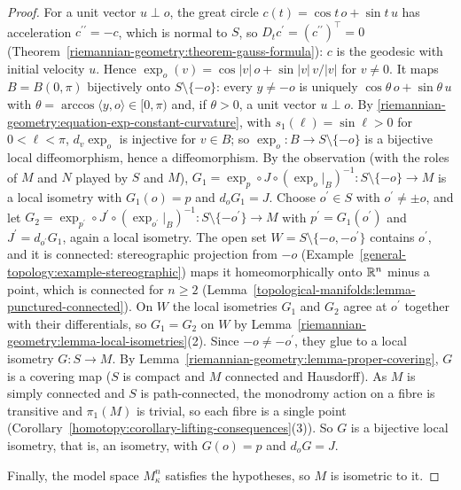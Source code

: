 \begin{proof}
For a unit vector $u \perp o$, the great circle $c(t) = \cos t\,o + \sin t\,u$ has acceleration $c^{\prime\prime} = -c$, which is normal to $S$, so
$D_tc^{\prime} = (c^{\prime\prime})^\top = 0$ (Theorem~\ref{riemannian-geometry:theorem-gauss-formula}): $c$ is the geodesic with initial velocity $u$. Hence
$\exp_o(v) = \cos|v|\,o + \sin|v|\,v/|v|$ for $v \neq 0$. It maps $B = B(0, \pi)$ bijectively onto $S \setminus \{-o\}$:
every $y \neq -o$ is uniquely $\cos\theta\,o + \sin\theta\,u$ with $\theta = \arccos\langle y, o\rangle \in [0, \pi)$ and, if $\theta > 0$, a unit vector $u \perp o$.
By \eqref{riemannian-geometry:equation-exp-constant-curvature}, with $s_1(\ell) = \sin\ell > 0$ for $0 < \ell < \pi$, $d_v\exp_o$ is injective for $v \in B$; so $\exp_o \colon B \to S \setminus \{-o\}$ is a bijective local
diffeomorphism, hence a diffeomorphism. By the observation (with the roles of $M$ and $N$ played by $S$ and $M$),
$G_1 = \exp_p \circ J \circ (\exp_o|_B)^{-1} \colon S \setminus \{-o\} \to M$ is a local isometry with $G_1(o) = p$ and $d_oG_1 = J$. Choose $o^{\prime} \in S$ with
$o^{\prime} \neq \pm o$, and let $G_2 = \exp_{p^{\prime}} \circ J^{\prime} \circ (\exp_{o^{\prime}}|_B)^{-1} \colon S \setminus \{-o^{\prime}\} \to M$ with
$p^{\prime} = G_1(o^{\prime})$ and $J^{\prime} = d_{o^{\prime}}G_1$, again a local isometry. The open set $W = S \setminus \{-o, -o^{\prime}\}$ contains $o^{\prime}$, and it
is connected: stereographic projection from $-o$ (Example~\ref{general-topology:example-stereographic}) maps it homeomorphically onto $\mathbb{R}^n$ minus a point, which is
connected for $n \geq 2$ (Lemma~\ref{topological-manifolds:lemma-punctured-connected}). On $W$ the local isometries $G_1$ and $G_2$ agree at $o^{\prime}$ together with
their differentials, so $G_1 = G_2$ on $W$ by Lemma~\ref{riemannian-geometry:lemma-local-isometries}(2). Since $-o \neq -o^{\prime}$, they glue to a local isometry
$G \colon S \to M$. By Lemma~\ref{riemannian-geometry:lemma-proper-covering}, $G$ is a covering map ($S$ is compact and $M$ connected and Hausdorff). As $M$ is simply
connected and $S$ is path-connected, the monodromy action on a fibre is transitive and $\pi_1(M)$ is trivial, so each fibre is a single point
(Corollary~\ref{homotopy:corollary-lifting-consequences}(3)). So $G$ is a bijective local isometry, that is, an isometry, with $G(o) = p$ and $d_oG = J$.

Finally, the model space $M^n_\kappa$ satisfies the hypotheses, so $M$ is isometric to it.
\end{proof}

